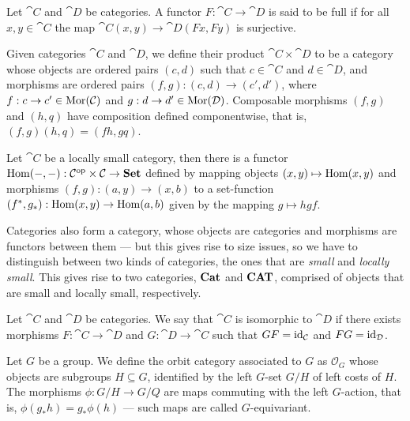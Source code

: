 \begin{definition}[Full]\label{def: full}
Let \(\cat C\) and \(\cat D\) be categories. A functor \(F: \cat C \to \cat D\)
is said to be full if for all \(x, y \in \cat C\) the map \(\cat C(x, y) \to
\cat D(F x, F y)\) is surjective.
\end{definition}

\begin{definition}\label{def:product-category}
Given categories \(\cat C\) and \(\cat D\), we define their product \(\cat C
\times \cat D\) to be a category whose objects are ordered pairs \((c, d)\) such
that \(c \in \cat C\) and \(d \in \cat D\), and morphisms are ordered pairs
\((f, g): (c, d) \to (c', d')\), where \(f: c \to c' \in \operatorname{Mor}(\mathcal C)\) and \(g:
d \to d' \in \operatorname{Mor}(\mathcal D)\). Composable morphisms \((f, g)\) and \((h, q)\) have
composition defined componentwise, that is, \((f, g) (h, q) = (fh, gq)\).
\end{definition}

\begin{definition}
\label{def:two-sided-represented-functor}
Let \(\cat C\) be a locally small category, then there is a functor \(\operatorname{Hom}(-,
-): \mathcal C^{\mathrm{op}} \times \mathcal C \to {\textbf{Set}}\) defined by mapping objects \((x, y)
\mapsto \operatorname{Hom}(x, y)\) and morphisms \((f, g): (a, y) \to (x, b)\) to a
set-function \((f^{*}, g_{*}): \operatorname{Hom}(x, y) \to \operatorname{Hom}(a, b)\) given by the mapping
\(g \mapsto h g f\).
\end{definition}

Categories also form a category, whose objects are categories and morphisms are
functors between them --- but this gives rise to size issues, so
we have to distinguish between two kinds of categories, the ones that are
\emph{small} and \emph{locally small}. This gives rise to two categories,
\({\textbf{Cat}}\) and \({\textbf{CAT}}\), comprised of objects that are small and locally small,
respectively.

\begin{definition}
\label{def:isomorphism-categories}
Let \(\cat C\) and \(\cat D\) be categories. We say that \(\cat C\) is
isomorphic to \(\cat D\) if there exists morphisms \(F: \cat C \to \cat D\) and
\(G: \cat D \to \cat C\) such that \(GF = \operatorname{id}_{\mathcal C}\) and \(FG = \operatorname{id}_{\mathcal D}\).
\end{definition}

\begin{example}
\label{exp:orbit-category}
Let \(G\) be a group. We define the orbit category associated to \(G\) as
\(\mathcal{O}_G\) whose objects are subgroups \(H \subseteq G\), identified by
the left \(G\)-set \(G/H\) of left costs of \(H\). The morphisms \(\phi: G/H \to
G/Q\) are maps commuting with the left \(G\)-action, that is, \(\phi(g_{*}h) =
g_{*} \phi(h)\) --- such maps are called \(G\)-equivariant.
\end{example}



